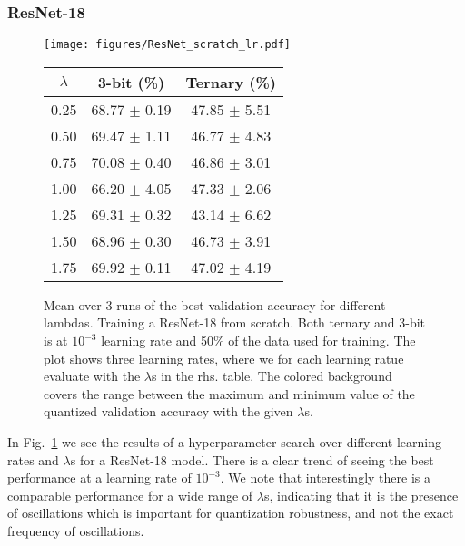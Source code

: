 \subsubsection{ResNet-18}
\begin{figure}[H]
    \centering
    \begin{minipage}{0.50\textwidth}
        \centering
        \texttt{[image: figures/ResNet\_scratch\_lr.pdf]}
    \end{minipage}%
    \hfill
    \begin{minipage}{0.45\textwidth}
        \centering
        \label{tab:best_val_accuracies}
        \begin{tabular}{|c|c|c|}
    \hline
    \textbf{$\lambda$} & \textbf{3-bit (\%)} & \textbf{Ternary (\%)} \\ \hline
    0.25 & 68.77 $\pm$ 0.19 & 47.85 $\pm$ 5.51 \\ \hline
    0.50 & 69.47 $\pm$ 1.11 & 46.77 $\pm$ 4.83 \\ \hline
    0.75 & 70.08 $\pm$ 0.40 & 46.86 $\pm$ 3.01 \\ \hline
    1.00 & 66.20 $\pm$ 4.05 & 47.33 $\pm$ 2.06 \\ \hline
    1.25 & 69.31 $\pm$ 0.32 & 43.14 $\pm$ 6.62 \\ \hline
    1.50 & 68.96 $\pm$ 0.30 & 46.73 $\pm$ 3.91 \\ \hline
    1.75 & 69.92 $\pm$ 0.11 & 47.02 $\pm$ 4.19 \\ \hline
\end{tabular}
    \end{minipage}
    \caption{Mean over 3 runs of the best validation accuracy for different lambdas. Training a ResNet-18 from scratch. Both ternary and 3-bit is at $10^{-3}$ learning rate and 50\% of the data used for training. The plot shows three learning rates, where we for each learning ratue evaluate with the $\lambda$s in the rhs. table. The colored background covers the range between the maximum and minimum value of the quantized validation accuracy with the given $\lambda$s.}
    \label{fig:ResNet_scratch_hyperparam}
\end{figure}
In Fig.~\ref{fig:ResNet_scratch_hyperparam} we see the results of a hyperparameter search over different learning rates and $\lambda$s for a ResNet-18 model. There is a clear trend of seeing the best performance at a learning rate of $10^{-3}$. We note that interestingly there is a comparable performance for a wide range of $\lambda$s, indicating that it is the presence of oscillations which is important for quantization robustness, and not the exact frequency of oscillations. 

